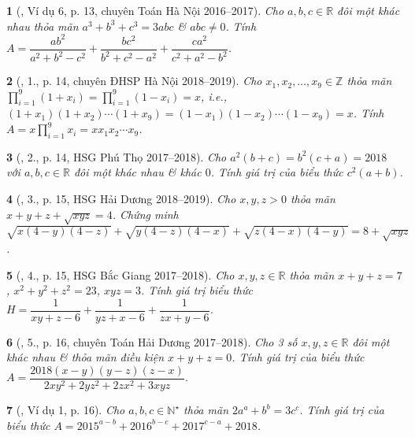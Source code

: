 \documentclass{article}
\newtheorem{baitoan}{}
\begin{document}
\begin{baitoan}[\cite{Lam_An_Tuan_Toan_9_dai_so}, Ví dụ 6, p. 13, chuyên Toán Hà Nội 2016--2017]
	Cho $a,b,c\in\mathbb{R}$ đôi một khác nhau thỏa mãn $a^3 + b^3 + c^3 = 3abc$ \& $abc\ne0$. Tính $A = \dfrac{ab^2}{a^2 + b^2 - c^2} + \dfrac{bc^2}{b^2 + c^2 - a^2} + \dfrac{ca^2}{c^2 + a^2 - b^2}$.
\end{baitoan}

\begin{baitoan}[\cite{Lam_An_Tuan_Toan_9_dai_so}, 1., p. 14, chuyên ĐHSP Hà Nội 2018--2019]
	Cho $x_1,x_2,\ldots,x_9\in\mathbb{Z}$ thỏa mãn $\prod_{i=1}^9 (1 + x_i) = \prod_{i=1}^9 (1 - x_i) = x$, i.e., $(1 + x_1)(1 + x_2)\cdots(1 + x_9) = (1 - x_1)(1 - x_2)\cdots(1 - x_9) = x$. Tính $A = x\prod_{i=1}^9 x_i = xx_1x_2\cdots x_9$.
\end{baitoan}

\begin{baitoan}[\cite{Lam_An_Tuan_Toan_9_dai_so}, 2., p. 14, HSG Phú Thọ 2017--2018]
	Cho $a^2(b + c) = b^2(c + a) = 2018$ với $a,b,c\in\mathbb{R}$ đôi một khác nhau \& khác $0$. Tính giá trị của biểu thức $c^2(a + b)$.
\end{baitoan}

\begin{baitoan}[\cite{Lam_An_Tuan_Toan_9_dai_so}, 3., p. 15, HSG Hải Dương 2018--2019]
	Cho $x,y,z > 0$ thỏa mãn $x + y + z + \sqrt{xyz} = 4$. Chứng minh $\sqrt{x(4 - y)(4 - z)} + \sqrt{y(4 - z)(4 - x)} + \sqrt{z(4 - x)(4 - y)} = 8 + \sqrt{xyz}$.
\end{baitoan}

\begin{baitoan}[\cite{Lam_An_Tuan_Toan_9_dai_so}, 4., p. 15, HSG Bắc Giang 2017--2018]
	Cho $x,y,z\in\mathbb{R}$ thỏa mãn $x + y + z = 7$, $x^2 + y^2 + z^2 = 23$, $xyz = 3$. Tính giá trị biểu thức $H = \dfrac{1}{xy + z - 6} + \dfrac{1}{yz + x - 6} + \dfrac{1}{zx + y - 6}$.
\end{baitoan}

\begin{baitoan}[\cite{Lam_An_Tuan_Toan_9_dai_so}, 5., p. 16, chuyên Toán Hải Dương 2017--2018]
	Cho 3 số $x,y,z\in\mathbb{R}$ đôi một khác nhau \& thỏa mãn điều kiện $x + y + z = 0$. Tính giá trị của biểu thức $A = \dfrac{2018(x - y)(y - z)(z - x)}{2xy^2 + 2yz^2 + 2zx^2 + 3xyz}$.
\end{baitoan}

\begin{baitoan}[\cite{Lam_An_Tuan_Toan_9_dai_so}, Ví dụ 1, p. 16]
	Cho $a,b,c\in\mathbb{N}^\star$ thỏa mãn $2a^a + b^b = 3c^c$. Tính giá trị của biểu thức $A = 2015^{a - b} + 2016^{b - c} + 2017^{c - a} + 2018$.
\end{baitoan}
\end{document}
